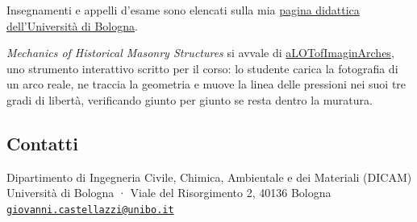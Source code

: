 \documentclass[
  italian,
  10pt,
  a4paper,
  DIV=11,
  numbers=noendperiod]{scrartcl}
\begin{document}
Insegnamenti e appelli d'esame sono elencati sulla mia
\href{https://www.unibo.it/sitoweb/giovanni.castellazzi/teachings}{pagina
didattica dell'Università di Bologna}.

\begin{tcolorbox}[enhanced jigsaw, arc=.35mm, bottomrule=.15mm, breakable, colback=white, colframe=quarto-callout-note-color-frame, left=2mm, leftrule=.75mm, opacityback=0, rightrule=.15mm, toprule=.15mm]
\begin{minipage}[t]{5.5mm}
\textcolor{quarto-callout-note-color}{\faInfo}
\end{minipage}%
\begin{minipage}[t]{\textwidth - 5.5mm}

\emph{Mechanics of Historical Masonry Structures} si avvale di
\href{https://gcastellazzi.github.io/aLoTiA/app/}{aLOTofImaginArches},
uno strumento interattivo scritto per il corso: lo studente carica la
fotografia di un arco reale, ne traccia la geometria e muove la linea
delle pressioni nei suoi tre gradi di libertà, verificando giunto per
giunto se resta dentro la muratura.

\end{minipage}%
\end{tcolorbox}

\subsection{Contatti}\label{contatti}

Dipartimento di Ingegneria Civile, Chimica, Ambientale e dei Materiali
(DICAM) Università di Bologna · Viale del Risorgimento 2, 40136 Bologna
\href{mailto:giovanni.castellazzi@unibo.it}{\nolinkurl{giovanni.castellazzi@unibo.it}}
\end{document}
